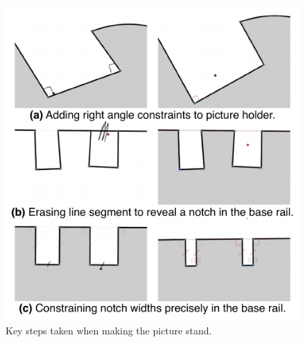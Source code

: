 \begin{figure}
  \centering
  \includegraphics{img/motivating-example.pdf}
  \caption[Interaction steps to a picture frame]{Key steps taken when
    making the picture stand.}
  \label{fig:motivating}
\end{figure}

